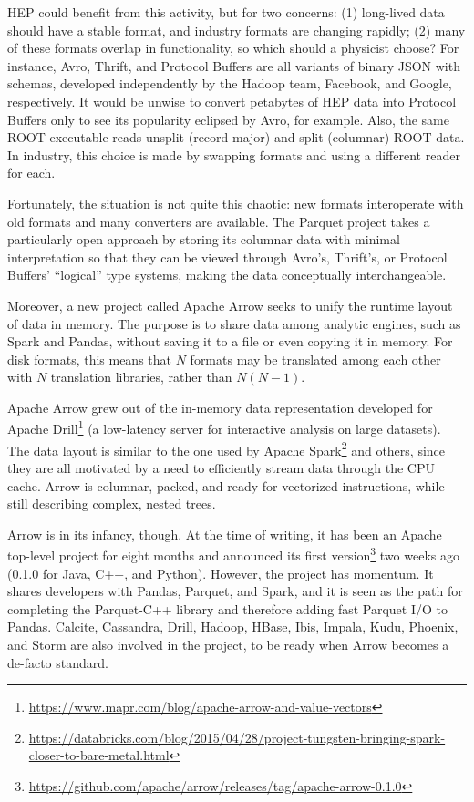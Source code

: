 \documentclass{article}
\begin{document}
HEP could benefit from this activity, but for two concerns: (1) long-lived data should have a stable format, and industry formats are changing rapidly; (2) many of these formats overlap in functionality, so which should a physicist choose? For instance, Avro, Thrift, and Protocol Buffers are all variants of binary JSON with schemas, developed independently by the Hadoop team, Facebook, and Google, respectively. It would be unwise to convert petabytes of HEP data into Protocol Buffers only to see its popularity eclipsed by Avro, for example. Also, the same ROOT executable reads unsplit (record-major) and split (columnar) ROOT data. In industry, this choice is made by swapping formats and using a different reader for each.

Fortunately, the situation is not quite this chaotic: new formats interoperate with old formats and many converters are available. The Parquet project takes a particularly open approach by storing its columnar data with minimal interpretation so that they can be viewed through Avro's, Thrift's, or Protocol Buffers' ``logical'' type systems, making the data conceptually interchangeable.

Moreover, a new project called Apache Arrow seeks to unify the runtime layout of data in memory. The purpose is to share data among analytic engines, such as Spark and Pandas, without saving it to a file or even copying it in memory. For disk formats, this means that $N$ formats may be translated among each other with $N$ translation libraries, rather than $N(N - 1)$.

Apache Arrow grew out of the in-memory data representation developed for Apache Drill\footnote{\url{https://www.mapr.com/blog/apache-arrow-and-value-vectors}} (a low-latency server for interactive analysis on large datasets). The data layout is similar to the one used by Apache Spark\footnote{\url{https://databricks.com/blog/2015/04/28/project-tungsten-bringing-spark-closer-to-bare-metal.html}} and others, since they are all motivated by a need to efficiently stream data through the CPU cache. Arrow is columnar, packed, and ready for vectorized instructions, while still describing complex, nested trees.

Arrow is in its infancy, though. At the time of writing, it has been an Apache top-level project for eight months and announced its first version\footnote{\url{https://github.com/apache/arrow/releases/tag/apache-arrow-0.1.0}} two weeks ago (0.1.0 for Java, C++, and Python). However, the project has momentum. It shares developers with Pandas, Parquet, and Spark, and it is seen as the path for completing the Parquet-C++ library and therefore adding fast Parquet I/O to Pandas. Calcite, Cassandra, Drill, Hadoop, HBase, Ibis, Impala, Kudu, Phoenix, and Storm are also involved in the project, to be ready when Arrow becomes a de-facto standard.
\end{document}
